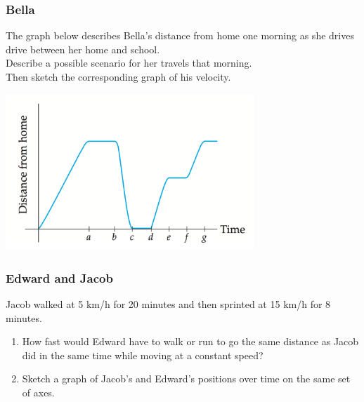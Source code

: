 \documentclass[14pt]{beamer}
\begin{document}



	\begin{frame}
		\frametitle{Bella}

		The graph below describes Bella's distance from home one morning as she
		drives drive between her home and school.\\

		Describe a possible scenario for her travels that morning. \\ Then sketch
		the corresponding graph of his velocity.

		\begin{center}
			\includegraphics[width=0.7\textwidth]{G9}
		\end{center}
	\end{frame}


	\begin{frame}
		\frametitle{Edward and Jacob}

		Jacob walked at 5 km/h for 20 minutes and then sprinted at 15 km/h for 8
		minutes.
		\begin{enumerate}
			\item How fast would Edward have to walk or run to go the same distance as
				Jacob did in the same time while moving at a constant speed?

			\item Sketch a graph of Jacob's and Edward's positions over time on the same
				set of axes.
		\end{enumerate}
	\end{frame}

\end{document}
